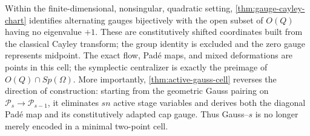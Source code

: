 \documentclass[11pt,a4paper]{article}
\begin{document}
Within the finite-dimensional, nonsingular, quadratic setting,
\cref{thm:gauge-cayley-chart} identifies alternating gauges bijectively
with the open subset of \(O(Q)\) having no eigenvalue \(+1\).  These are
constitutively shifted coordinates built from the classical Cayley
transform; the group identity is excluded and the zero gauge represents
midpoint.  The exact flow, Pad\'e maps, and mixed deformations are points
in this cell; the symplectic centralizer is exactly the preimage of
\(O(Q)\cap Sp(\Omega)\).  More importantly,
\cref{thm:active-gauss-cell} reverses the direction of construction:
starting from the geometric Gauss pairing on
\(\mathcal P_s\to\mathcal P_{s-1}\), it eliminates \(sn\) active stage
variables and derives both the diagonal Pad\'e map and its constitutively
adapted cap gauge.  Thus Gauss--\(s\) is no longer merely encoded in a
minimal two-point cell.
\end{document}
